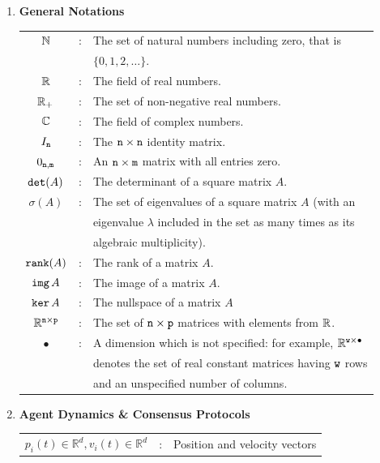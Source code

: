 \begin{enumerate}
    \item {\bf General Notations}\\
        \begin{tabular}{cll}
             $\mathbb{N}$	&:&	The set of natural numbers including zero, that is \\
             & & $\{0, 1, 2, \hdots \}$. \\
             $\mathbb{R}$ &:& The field of real numbers. \\
             $\mathbb{R}_{+}$ &:& The set of non-negative real numbers.\\
             $\mathbb{C}$		&:& The field of complex numbers. \\
             $I_{{\tt{n}}}$ &:& The ${{\tt{n}}} \times {{\tt{n}}}$ identity matrix.\\
             $0_{{{\tt{n}}},{\tt{m}}}$ &:& An ${{\tt{n}}} \times {\tt{m}}$ matrix with all entries zero.\\
             ${\tt det}(A)$ &:& The determinant of a square matrix $A$.\\
             ${\sigma}(A)$ &:& The set of eigenvalues of a square matrix $A$ (with an\\
             & & eigenvalue  $\lambda$ included in the set as many times as its\\
             & & algebraic multiplicity).\\
             ${\tt rank}(A)$ &:& The rank of a matrix $A$.\\
             ${\tt img\,}A$ &:& The image of a matrix $A$.\\
             ${\tt ker\,}A$ &:& The nullspace of a matrix $A$\\
             $\mathbb{R}^{{\tt{n}} \times \tt{p}}$	&:& The set of ${{\tt{n}}} \times {\tt{p}}$ matrices with elements from $\mathbb{R}$.\\
             $\bullet$ &:& A dimension which is not specified: for example, $\mathbb{R}^{{\tt{w}} \times \bullet}$ \\
             & & denotes the set of real constant matrices having ${\tt{w}}$ rows\\
             & & and an unspecified number of columns.\\
    \end{tabular}
    \item {\bf Agent Dynamics \& Consensus Protocols}\\
        \begin{tabular}{cll}
        	$p_i(t) \in \mathbb{R}^d, v_i(t) \in \mathbb{R}^d$ &:& Position and velocity vectors \\

\end{tabular}
\end{enumerate}
